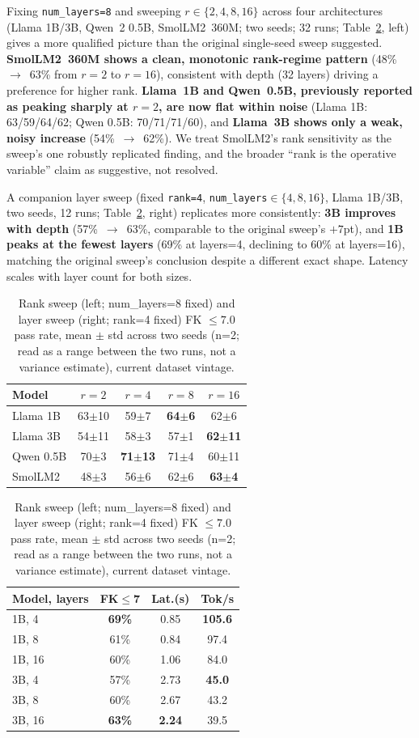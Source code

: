 \documentclass[pdflatex,sn-mathphys-num]{sn-jnl}%
\begin{document}
Fixing \texttt{num\_layers=8} and sweeping $r \in \{2,4,8,16\}$ across four architectures (Llama 1B/3B, Qwen~2 0.5B, SmolLM2~360M; two seeds; 32 runs; Table~\ref{tab:sweeps}, left) gives a more qualified picture than the original single-seed sweep suggested. \textbf{SmolLM2~360M shows a clean, monotonic rank-regime pattern} (48\%~$\to$~63\% from $r{=}2$ to $r{=}16$), consistent with depth (32 layers) driving a preference for higher rank. \textbf{Llama~1B and Qwen~0.5B, previously reported as peaking sharply at $r{=}2$, are now flat within noise} (Llama 1B: 63/59/64/62; Qwen 0.5B: 70/71/71/60), and \textbf{Llama~3B shows only a weak, noisy increase} (54\%~$\to$~62\%). We treat SmolLM2's rank sensitivity as the sweep's one robustly replicated finding, and the broader ``rank is the operative variable'' claim as suggestive, not resolved.

A companion layer sweep (fixed \texttt{rank=4}, \texttt{num\_layers}$\in\{4,8,16\}$, Llama 1B/3B, two seeds, 12 runs; Table~\ref{tab:sweeps}, right) replicates more consistently: \textbf{3B improves with depth} (57\%~$\to$~63\%, comparable to the original sweep's $+7$pt), and \textbf{1B peaks at the fewest layers} (69\% at layers=4, declining to 60\% at layers=16), matching the original sweep's conclusion despite a different exact shape. Latency scales with layer count for both sizes.

\begin{table}[!h]
  \centering
  \caption{Rank sweep (left; num\_layers=8 fixed) and layer sweep (right; rank=4 fixed) FK $\leq 7.0$ pass rate, mean $\pm$ std across two seeds (n=2; read as a range between the two runs, not a variance estimate), current dataset vintage.}
  \label{tab:sweeps}
  \scriptsize
  \setlength{\tabcolsep}{3pt}
  \begin{tabular}{@{}lcccc@{}}
    \toprule
    Model     & $r{=}2$ & $r{=}4$ & $r{=}8$ & $r{=}16$ \\
    \midrule
    Llama 1B  & 63$\pm$10 & 59$\pm$7 & \textbf{64$\pm$6} & 62$\pm$6 \\
    Llama 3B  & 54$\pm$11 & 58$\pm$3 & 57$\pm$1 & \textbf{62$\pm$11} \\
    Qwen 0.5B & 70$\pm$3 & \textbf{71$\pm$13} & 71$\pm$4 & 60$\pm$11 \\
    SmolLM2   & 48$\pm$3 & 56$\pm$6 & 62$\pm$6 & \textbf{63$\pm$4} \\
    \bottomrule
  \end{tabular}
  \qquad
  \begin{tabular}{@{}lccc@{}}
    \toprule
    Model, layers & FK$\leq$7 & Lat.(s) & Tok/s \\
    \midrule
    1B, 4  & \textbf{69\%} & 0.85 & \textbf{105.6} \\
    1B, 8  & 61\% & 0.84 & 97.4 \\
    1B, 16 & 60\% & 1.06 & 84.0 \\
    3B, 4  & 57\% & 2.73 & \textbf{45.0} \\
    3B, 8  & 60\% & 2.67 & 43.2 \\
    3B, 16 & \textbf{63\%} & \textbf{2.24} & 39.5 \\
    \bottomrule
  \end{tabular}
\end{table}
\end{document}
